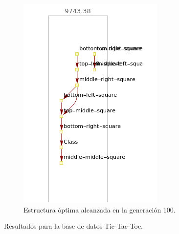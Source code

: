 \documentclass[10pt,a4paper]{article}
\begin{document}
\begin{figure}[htb!]
\begin{subfigure}[b]{0.475\textwidth}
            \includegraphics[width=\textwidth]{img/tic-tac-toe/best.png}
            \caption[ ]{{Estructura óptima alcanzada en la generación 100.}}
        \end{subfigure}

\caption{Resultados para la base de datos Tic-Tac-Toe.}
\label{fig:tic-tac-toe_results}
\end{figure}

\clearpage
\nocite*
{}

\end{document}
